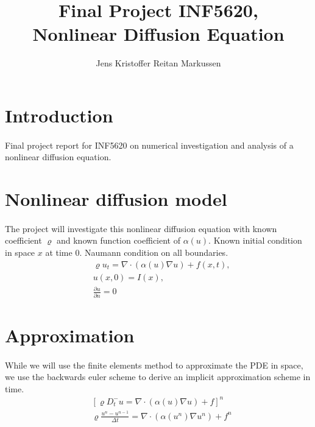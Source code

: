 \documentclass[11pt,a4paper]{article}
\author{Jens Kristoffer Reitan Markussen}
\title{Final Project INF5620,\\ Nonlinear Diffusion Equation}
\begin{document}
\maketitle

\section{Introduction}
\paragraph*{}
Final project report for INF5620 on numerical investigation and analysis of a nonlinear diffusion equation.

\section{Nonlinear diffusion model}
\paragraph*{}
The project will investigate this nonlinear diffusion equation with known coefficient $\varrho$ and known function coefficient of $\alpha(u)$. Known initial condition in space $x$ at time $0$. Naumann condition on all boundaries.
\begin{align}
& \varrho u_t = \nabla \cdot (\alpha(u)\nabla u) + f(x,t),\\
& u(x,0)=I(x),\\
& \frac{\partial u}{\partial n} = 0
\end{align}

\section{Approximation}
\paragraph*{} 
While we will use the finite elements method to approximate the PDE in space, we use the backwards euler scheme to derive an implicit approximation scheme in time.
\begin{align}
 & \left[\varrho D^-_t u  = \nabla \cdot (\alpha(u)\nabla u) + f\right]^n\\
 & \varrho \frac{u^n-u^{n-1}}{\Delta t} = \nabla \cdot (\alpha(u^n)\nabla u^n)+ f^n %
\end{align}
\end{document}
